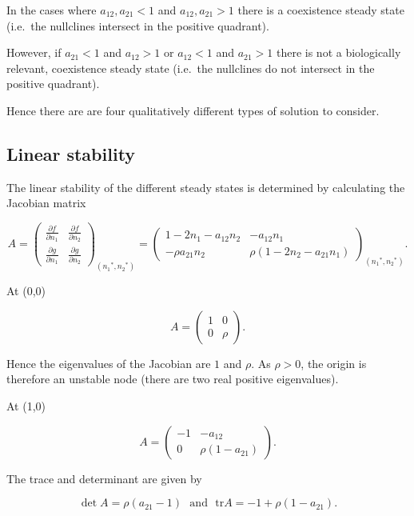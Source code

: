 \documentclass[
  letterpaper,
  DIV=11,
  numbers=noendperiod]{scrreprt}
\begin{document}
In the cases where \(a_{12},a_{21}<1\) and \(a_{12},a_{21}>1\) there is
a coexistence steady state (i.e.~the nullclines intersect in the
positive quadrant).

However, if \(a_{21}<1\) and \(a_{12}>1\) or \(a_{12}<1\) and
\(a_{21}>1\) there is not a biologically relevant, coexistence steady
state (i.e.~the nullclines do not intersect in the positive quadrant).

Hence there are are four qualitatively different types of solution to
consider.

\hypertarget{linear-stability-4}{%
\subsection{Linear stability}\label{linear-stability-4}}

The linear stability of the different steady states is determined by
calculating the Jacobian matrix

\[
A=\left(\begin{array}{rr}
\frac{\partial f}{\partial n_1}&\frac{\partial f}{\partial n_2} \\ \frac{\partial g}{\partial n_1 }&\frac{\partial g}{\partial n_2} \end{array}\right)_{({n_1}^*,{n_2}^*)} = \left(\begin{array}{rr}
1-2n_1 -a_{12}n_2&-a_{12}n_1 \\ -\rho a_{21}n_2 &\rho(1-2n_2-a_{21}n_1)\end{array}\right)_{({n_1}^*,{n_2}^*)}. 
\]

At (0,0)

\[
A=\left(\begin{array}{rr}
1& 0 \\ 0 & \rho\end{array}\right). 
\]

Hence the eigenvalues of the Jacobian are \(1\) and \(\rho\). As
\(\rho>0\), the origin is therefore an unstable node (there are two real
positive eigenvalues).

At (1,0)

\[
A=\left(\begin{array}{rr}
-1& -a_{12} \\ 0 & \rho(1-a_{21})\end{array}\right). 
\]

The trace and determinant are given by

\[
\det{A}=\rho  (a_{21}-1)\ \ \ \textrm{and} \ \ \ \mathrm{tr}{A}=-1+\rho(1-a_{21}).
\]
\end{document}
